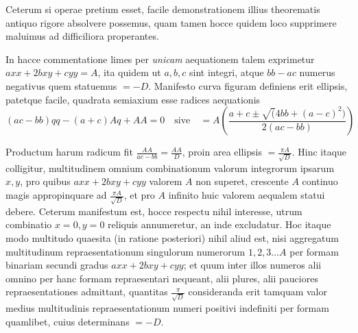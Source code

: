 %
Ceterum si operae pretium esset, facile demonstrationem illius theorematis antiquo rigore absolvere possemus, quam tamen hocce quidem loco supprimere maluimus ad difficiliora properantes.

In hacce commentatione limes per \emph{unicam} aequationem talem exprimetur $axx+2bxy+cyy=A$, ita quidem ut $a,b,c$ sint integri, atque $bb-ac$ numerus negativus quem statuemus $=-D$. Manifesto curva figuram definiens erit ellipsis, patetque facile, quadrata semiaxium esse radices aequationis
\[
(ac-bb)qq-(a+c)Aq+AA=0\quad\text{sive}\quad
=A\left(\frac{a+c\pm\surd(4bb+(a-c)^2)}{2(ac-bb)}\right)
\]

Productum harum radicum fit $\frac{AA}{ac-bb}=\frac{AA}D$, proin area ellipsis $=\frac{\pi A}{\surd D}$. Hinc itaque colligitur, multitudinem omnium combinationum valorum integrorum ipsarum $x,y$, pro quibus $axx+2bxy+cyy$ valorem $A$ non superet, crescente $A$ continuo magis appropinquare ad $\frac{\pi A}{\surd D}$, et pro $A$ infinito huic valorem aequalem statui debere. Ceterum manifestum est, hocce respectu nihil interesse, utrum combinatio $x=0,y=0$ reliquis annumeretur, an inde excludatur. Hoc itaque modo multitudo quaesita (in ratione posteriori) nihil aliud est, nisi aggregatum multitudinum repraesentationum singulorum numerorum $1,2,3\ldots A$ per formam binariam secundi gradus $axx+2bxy+cyy$; et quum inter illos numeros alii omnino per hanc formam repraesentari nequeant, alii plures, alii pauciores repraesentationes admittant, quantitas $\frac\pi{\surd D}$ consideranda erit tamquam valor medius multitudinis repraesentationum numeri positivi indefiniti per formam quamlibet, cuius determinans $=-D$.

